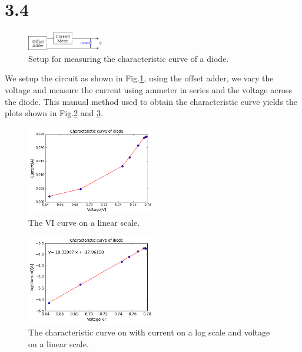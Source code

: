 \documentclass[authoryear, 12pt,5p, times]{elsarticle}
\begin{document}
\section*{3.4}
\begin{figure}[h!]
\center
\includegraphics[width=0.3\textwidth]{figure/3_4_diag}
\caption{Setup for measuring the characteristic curve of a diode.}
\label{3_4_diag}
\end{figure}
We setup the circuit as shown in Fig.\ref{3_4_diag}, using the offset adder, we vary the voltage and measure the current using ammeter in series and the voltage across the diode. This manual method used to obtain the characteristic curve yields the plots shown in Fig.\ref{3_4_no_log} and \ref{3_4_log}.
\begin{figure}[h!]
\center
\includegraphics[width=0.5\textwidth]{figure/3_4_no_log}
\caption{The VI curve on a linear scale.}
\label{3_4_no_log}
\end{figure}
\begin{figure}[h!]
\center
\includegraphics[width=0.5\textwidth]{figure/3_4_log}
\caption{The characteristic curve on with current on a log  scale and voltage on a linear scale.}
\label{3_4_log}
\end{figure}
\end{document}
